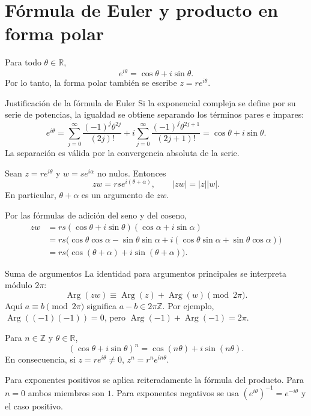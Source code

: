 \section{Fórmula de Euler y producto en forma polar}
\begin{proposicion}[{title={Fórmula de Euler}}]
Para todo $\theta\in\mathbb R$,
\[
e^{i\theta}=\cos\theta+i\sin\theta.
\]
Por lo tanto, la forma polar también se escribe $z=re^{i\theta}$.
\end{proposicion}

\begin{nota}{Justificación de la fórmula de Euler}
Si la exponencial compleja se define por su serie de potencias,
la igualdad se obtiene separando los términos pares e impares:
\[
e^{i\theta}
=\sum_{j=0}^{\infty}\frac{(-1)^j\theta^{2j}}{(2j)!}
+i\sum_{j=0}^{\infty}\frac{(-1)^j\theta^{2j+1}}{(2j+1)!}
=\cos\theta+i\sin\theta.
\]
La separación es válida por la convergencia absoluta de la serie.
\end{nota}

\begin{proposicion}
Sean $z=re^{i\theta}$ y $w=se^{i\alpha}$ no nulos. Entonces
\[
zw=rs e^{i(\theta+\alpha)},\qquad |zw|=|z||w|.
\]
En particular, $\theta+\alpha$ es un argumento de $zw$.
\end{proposicion}
\begin{demostracion}
Por las fórmulas de adición del seno y del coseno,
\begin{align*}
zw&=rs(\cos\theta+i\sin\theta)(\cos\alpha+i\sin\alpha)\\
&=rs\bigl(\cos\theta\cos\alpha-\sin\theta\sin\alpha
+i(\cos\theta\sin\alpha+\sin\theta\cos\alpha)\bigr)\\
&=rs\bigl(\cos(\theta+\alpha)+i\sin(\theta+\alpha)\bigr).
\end{align*}
\end{demostracion}
\begin{nota}{Suma de argumentos}
La identidad para argumentos principales se interpreta módulo $2\pi$:
\[
\operatorname{Arg}(zw)\equiv
\operatorname{Arg}(z)+\operatorname{Arg}(w)\pmod{2\pi}.
\]
Aquí $a\equiv b\pmod{2\pi}$ significa $a-b\in2\pi\mathbb Z$.
Por ejemplo, $\operatorname{Arg}((-1)(-1))=0$, pero
$\operatorname{Arg}(-1)+\operatorname{Arg}(-1)=2\pi$.
\end{nota}

\begin{proposicion}[{title={Fórmula de De Moivre}}]
Para $n\in\mathbb Z$ y $\theta\in\mathbb R$,
\[
(\cos\theta+i\sin\theta)^n=\cos(n\theta)+i\sin(n\theta).
\]
En consecuencia, si $z=re^{i\theta}\neq0$,
$z^n=r^n e^{in\theta}$.
\end{proposicion}
\begin{demostracion}
Para exponentes positivos se aplica reiteradamente la fórmula del
producto. Para $n=0$ ambos miembros son $1$. Para exponentes negativos
se usa $(e^{i\theta})^{-1}=e^{-i\theta}$ y el caso positivo.
\end{demostracion}

